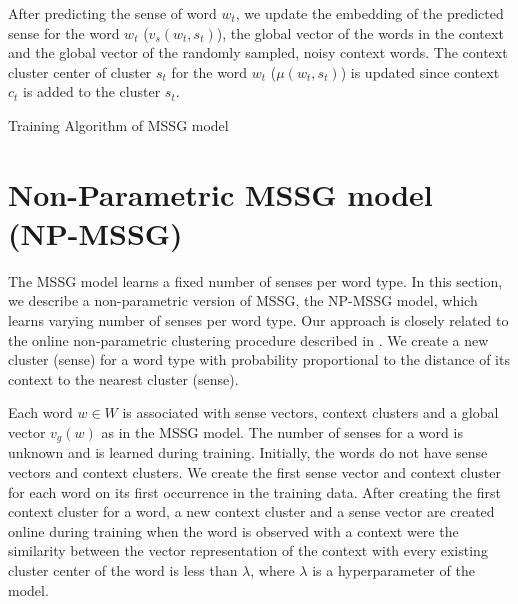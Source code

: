 \documentclass[11pt,a4paper]{article}
\DeclareMathOperator*{\argmax}{arg\,max}
\begin{document}
After predicting the sense of word $w_t$, we update the embedding of the predicted sense for the word $w_t$ ($v_s(w_t, s_t)$), the global vector of the words in the context and the global vector of the randomly sampled, noisy context words. The context cluster center of cluster $s_t$ for the word $w_t$ ($\mu(w_t, s_t)$) is updated since context $c_t$ is added to the cluster $s_t$.

\begin{algorithm}
\caption{Training Algorithm of MSSG model}
\end{algorithm}

\section{Non-Parametric MSSG model (NP-MSSG)}

The MSSG model learns a fixed number of senses per word type. In this
section, we describe a non-parametric version of MSSG, the
NP-MSSG model, which learns varying number of senses per word type. Our
approach is closely related to the online non-parametric clustering
procedure described in . We create a new
cluster (sense) for a word type with probability proportional to the
distance of its context to the nearest cluster (sense).

Each word $w \in W$ is associated with sense vectors, context clusters
and a global vector $v_g(w)$ as in the MSSG model. The number of senses
for a word is unknown and is learned during training. Initially, the
words do not have sense vectors and context clusters. We create the
first sense vector and context cluster for each word on its first
occurrence in the training data. After creating the first context
cluster for a word, a new context cluster and a sense vector are
created online during training when the word is observed with a
context were the similarity between the vector representation of the
context with every existing cluster center of the word is less than
$\lambda$, where $\lambda$ is a hyperparameter of the model.
\end{document}
